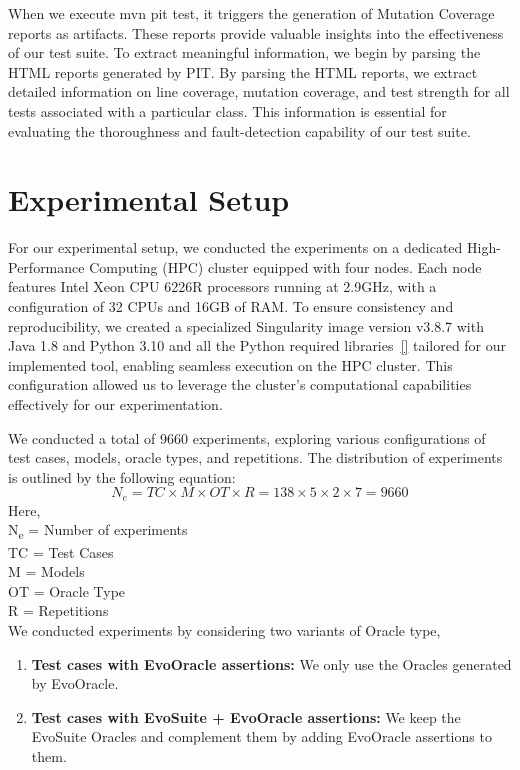 When we execute mvn pit test, it triggers the generation of Mutation Coverage reports as artifacts. These reports provide valuable insights into the effectiveness of our test suite. To extract meaningful information, we begin by parsing the HTML reports generated by PIT. By parsing the HTML reports, we extract detailed information on line coverage, mutation coverage, and test strength for all tests associated with a particular class. This information is essential for evaluating the thoroughness and fault-detection capability of our test suite.

\section{Experimental Setup}
\label{sec:experimental_setup}
\vspace{0.2 cm}

For our experimental setup, we conducted the experiments on a dedicated High-Performance Computing (HPC) cluster equipped with four nodes. Each node features Intel Xeon CPU 6226R\cite{noauthor_intel_nodate} processors running at 2.9GHz, with a configuration of 32 CPUs and 16GB of RAM. To ensure consistency and reproducibility, we created a specialized Singularity\cite{noauthor_introduction_nodate} image version v3.8.7\cite{noauthor_singularity_releases_nodate} with Java 1.8 and Python 3.10 and all the Python required libraries~\ref{} tailored for our implemented tool, enabling seamless execution on the HPC cluster. This configuration allowed us to leverage the cluster's computational capabilities effectively for our experimentation.

We conducted a total of 9660 experiments, exploring various configurations of test cases, models, oracle types, and repetitions. The distribution of experiments is outlined by the following equation:
\[
N_e = TC \times M \times OT \times R = 138 \times 5 \times 2 \times 7 = 9660
\]
Here, \\
N\textsubscript{e} = Number of experiments\\
TC = Test Cases\\
M = Models\\
OT = Oracle Type\\
R = Repetitions\\

\noindent
We conducted experiments by considering two variants of Oracle type, 
\begin{enumerate}
    \item \textbf{Test cases with EvoOracle assertions:} We only use the Oracles generated by EvoOracle.
    \item \textbf{Test cases with EvoSuite + EvoOracle assertions:} We keep the EvoSuite Oracles and complement them by adding EvoOracle assertions to them.
\end{enumerate}
\vspace{0.1 cm}
